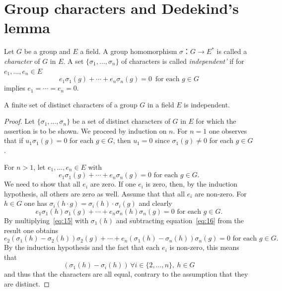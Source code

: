 \section{Group characters and Dedekind's lemma}
\label{sec:group-char-dedek}

\begin{definition}
  \label{def:4}
  Let $G$ be a group and $E$ a field. A group homomorphism $σ：G → E^*$ is called a \emph{character} of $G$ in $E$. A set $\{σ_1,\dots,σ_n\}$ of characters is called \emph{independent'} if for $e_1,\dots, e_n ∈ E$
  \begin{displaymath}
    e_1 σ_1(g) + \cdots + e_n σ_n(g) = 0 \, \text{ for each } g ∈ G 
  \end{displaymath}
  implies $e_1=\cdots=e_n=0$. 
\end{definition}


\begin{lemma}
  \label{lem:3}
  A finite set of distinct characters of a group $G$ in a field $E$ is independent. 
\end{lemma}

\begin{proof}
  Let $\{σ_1,\dots,σ_n\}$ be a set of distinct characters of $G$ in $E$ for which the assertion is to be shown. We proceed by induction on $n$. For $n=1$ one observes that if $u_1 σ_1(g) = 0$ for each $g ∈G$, then $u_1=0$ since $σ_1(g) ≠0$ for each $g ∈G$.

  For  $n>1$, let $e_1,\dots,e_n ∈E$ with
  \begin{equation}
    \label{eq:15}
   e_1  σ_1(g) + \cdots + e_n  σ_n(g) = 0 \text{ for each } g ∈G.     
  \end{equation}
 We need to show that all $e_i$ are zero. If one $e_i$ is zero, then, by the induction hypothesis,  all others are zero as well. Assume that that all $e_i$ are non-zero. For  $h ∈G$ one has $σ_i(h⋅ g) = σ_i(h) ⋅σ_i(g)$  and clearly
 \begin{equation}
   \label{eq:16}
   e_1  σ_1(h) σ_1(g) + \cdots + e_n  σ_n(h) σ_n(g) = 0 \text{ for each } g ∈G.
 \end{equation}
%
By multiplying~\eqref{eq:15} with $σ_1(h)$ and subtracting  equation~\eqref{eq:16} from the result one obtains 
\begin{displaymath}
   e_2  (σ_1(h) - σ_2(h))   σ_2(g) + \cdots + e_n  (σ_1(h) - σ_n(h))  σ_n(g) = 0 \text{ for each } g ∈G.
 \end{displaymath}
 By the induction hypothesis and the fact that each $e_i$ is non-zero, this means that
 \begin{displaymath}
    (σ_1(h) - σ_i(h)) \, ∀ i∈\{2,\dots,n\}, \ h ∈G 
  \end{displaymath}
  and thus that the characters are all equal, contrary to the assumption that they are distinct.
\end{proof}


